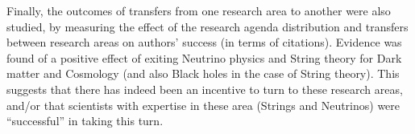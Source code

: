 \documentclass{article}
\begin{document}


Finally, the outcomes of transfers from one research area to another were also studied, by measuring the effect of the research agenda distribution and transfers between research areas  on authors' success (in terms of citations). Evidence was found of a positive effect of exiting Neutrino physics and String theory for Dark matter and Cosmology (and also Black holes in the case of String theory). This suggests that there has indeed been an incentive to turn to these research areas, and/or that scientists with expertise in these area (Strings and Neutrinos) were ``successful'' in taking this turn.


\end{document}
